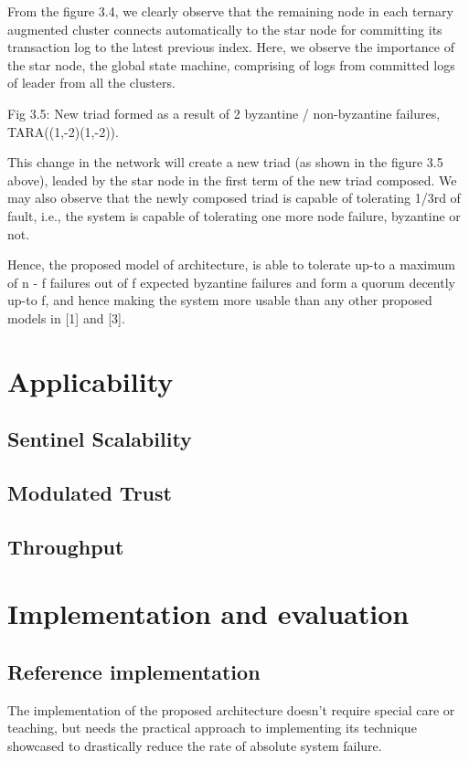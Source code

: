 \documentclass[]{article}
\begin{document}
From the figure 3.4, we clearly observe that the remaining node in each ternary augmented cluster connects automatically to the star node for committing its transaction log to the latest previous index. Here, we observe the importance of the star node, the global state machine, comprising of logs from committed logs of leader from all the clusters.


Fig 3.5: New triad formed as a result of 2 byzantine / non-byzantine failures, TARA((1,-2)(1,-2)).

This change in the network will create a new triad (as shown in the figure 3.5 above), leaded by the star node in the first term of the new triad composed. We may also observe that the newly composed triad is capable of tolerating 1/3rd of fault, i.e., the system is capable of tolerating one more node failure, byzantine or not.

Hence, the proposed model of architecture, is able to tolerate up-to a maximum of n - f failures out of f expected byzantine failures and form a quorum decently up-to f, and hence making the system more usable than any other proposed models in [1] and [3].

\section{Applicability}
\subsection{Sentinel Scalability}
\subsection{Modulated Trust}
\subsection{Throughput}

\section{Implementation and evaluation}
\subsection{Reference implementation}
The implementation of the proposed architecture doesn’t require special care or teaching, but needs the practical approach to implementing its technique showcased to drastically reduce the rate of absolute system failure. 
\end{document}
